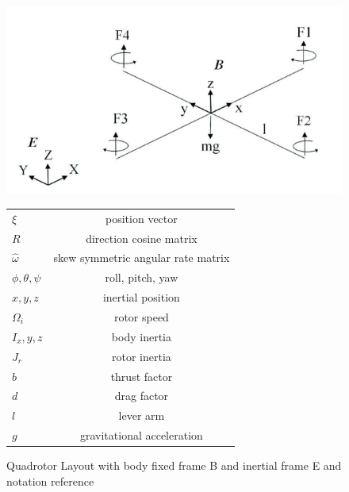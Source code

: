 \documentclass[conf]{new-aiaa}
\begin{document}
\begin{doublespace}
\begin{singlespace}
\begin{figure}
	\begin{minipage}{0.5\textwidth}
	\centering
	\includegraphics[scale= 0.45]{quad.png}
	\end{minipage}
	\begin{minipage}{0.5\textwidth}
		\begin{tabular}{| l | c |}
		  \hline			
		  $\xi$ & position vector\\
		  $R$ & direction cosine matrix\\
		  $\hat{\omega}$ &skew symmetric angular rate matrix\\
		  $\phi,\theta,\psi$ & roll, pitch, yaw\\
		  $x,y,z$ & inertial position\\
		  $\Omega_i$ & rotor speed\\
		  $I_x,y,z$ & body inertia\\
		  $J_r$ & rotor inertia\\
		  $b$ & thrust factor\\
		  $d$ & drag factor\\
		  $l$ & lever arm\\
		  $g$ & gravitational acceleration\\
		  \hline  
		\end{tabular}
	\end{minipage}
\end{figure}
\begin{figure}[!h]
	\caption{Quadrotor Layout with body fixed frame B and inertial frame E and notation reference}
	\label{fig:f1}	
\end{figure}
\end{singlespace}



\end{doublespace}
\end{document}

